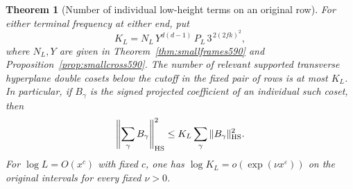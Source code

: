 \documentclass[a4paper,11pt]{article}
\newtheorem{theorem}[proposition]{Theorem}
\theoremstyle{definition}
\theoremstyle{remark}
\numberwithin{equation}{section}
\begin{document}
\begin{theorem}[Number of individual low-height terms on an original row]
\leavevmode\label{thm:smallorbits591}
For either terminal frequency at either end, put
\[
          K_L=N_L\,Y^{d(d-1)}\,P_L\,3^{\,2(2fk)^2},
\]
where \(N_L,Y\) are given in Theorem~\ref{thm:smallframes590}
and Proposition~\ref{prop:smallcross590}. The number of
relevant supported transverse hyperplane double cosets below
the cutoff in the fixed pair of rows is at most \(K_L\).
In particular, if \(B_\gamma\) is the signed projected
coefficient of an individual such coset, then
\[
  \left\|\sum_\gamma B_\gamma\right\|_{\rm HS}^2
                     \le K_L\sum_\gamma\|B_\gamma\|_{\rm HS}^2 .
\]
For \(\log L=O(x^c)\) with fixed \(c\), one has
\(\log K_L=o(\exp(\nu x^\varepsilon))\) on the original
intervals for every fixed \(\nu>0\).
\end{theorem}
\end{document}

